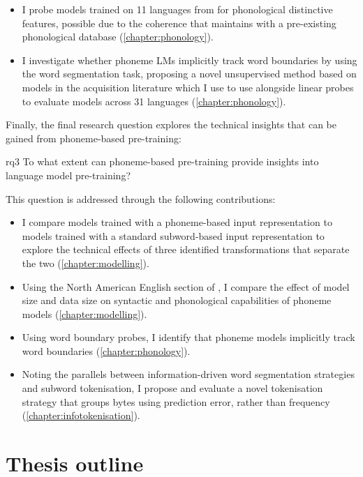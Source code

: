 \begin{itemize}
    \item I probe models trained on 11 languages from \ipachildes for phonological distinctive features, possible due to the coherence that \gpp maintains with a pre-existing phonological database (\cref{chapter:phonology}).
    \item I investigate whether phoneme LMs implicitly track word boundaries by using the word segmentation task, proposing a novel unsupervised method based on models in the acquisition literature which I use to use alongside linear probes to evaluate models across 31 languages (\cref{chapter:phonology}).
\end{itemize}

Finally, the final research question explores the technical insights that can be gained from phoneme-based pre-training:

\begin{question}{}{rq3}
    To what extent can phoneme-based pre-training provide insights into language model pre-training?
\end{question}

This question is addressed through the following contributions:

\begin{itemize}
    \item I compare models trained with a phoneme-based input representation to models trained with a standard subword-based input representation to explore the technical effects of three identified transformations that separate the two (\cref{chapter:modelling}).
    \item Using the North American English section of \ipachildes, I compare the effect of model size and data size on syntactic and phonological capabilities of phoneme models (\cref{chapter:modelling}).
    \item Using word boundary probes, I identify that phoneme models implicitly track word boundaries (\cref{chapter:phonology}).
    \item Noting the parallels between information-driven word segmentation strategies and subword tokenisation, I propose and evaluate a novel tokenisation strategy that groups bytes using prediction error, rather than frequency (\cref{chapter:infotokenisation}).
\end{itemize}

\section{Thesis outline}

